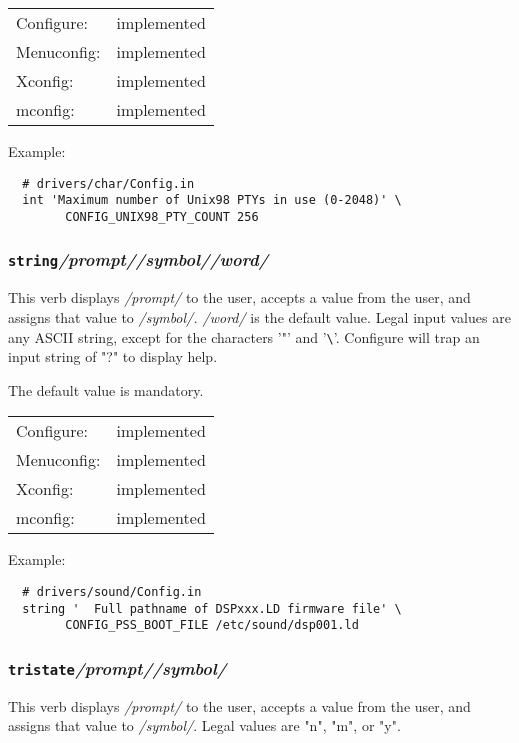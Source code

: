 \begin{tabular}{ll}
Configure:  &implemented\\
Menuconfig: &implemented\\
Xconfig:    &implemented\\
mconfig:    &implemented\\
\end{tabular}

Example:
{\small\begin{verbatim}
  # drivers/char/Config.in
  int 'Maximum number of Unix98 PTYs in use (0-2048)' \
        CONFIG_UNIX98_PTY_COUNT 256
\end{verbatim}}


\subsubsection{\texttt{string}\quad \textit{/prompt/}\quad \textit{/symbol/}\quad \textit{/word/}}

This verb displays \textit{/prompt/} to the user, accepts a value from the user,
and assigns that value to \textit{/symbol/.  /word/} is the default value.  Legal
input values are any ASCII string, except for the characters '"' and '\verb"\"'.
Configure will trap an input string of "?" to display help.

The default value is mandatory.

\begin{tabular}{ll}
Configure:  &implemented\\
Menuconfig: &implemented\\
Xconfig:    &implemented\\
mconfig:    &implemented\\
\end{tabular}

Example:
{\small\begin{verbatim}
  # drivers/sound/Config.in
  string '  Full pathname of DSPxxx.LD firmware file' \
        CONFIG_PSS_BOOT_FILE /etc/sound/dsp001.ld
\end{verbatim}}



\subsubsection{\texttt{tristate}\quad \textit{/prompt/}\quad \textit{/symbol/}}

This verb displays \textit{/prompt/} to the user, accepts a value from the user,
and assigns that value to \textit{/symbol/}.  Legal values are "n", "m", or "y".

